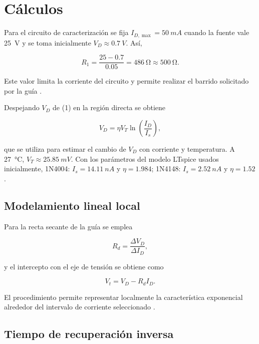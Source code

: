\documentclass[journal,a4paper]{IEEEtran}
\begin{document}
\section{Cálculos}

Para el circuito de caracterización se fija $I_{D,\max}=\SI{50}{mA}$ cuando la fuente vale \SI{25}{V} y se toma inicialmente $V_D\approx\SI{0.7}{V}$. Así,

\begin{equation}
R_1=\frac{25-0.7}{0.05}=\SI{486}{\ohm}\approx\SI{500}{\ohm}.
\label{eq:r1}
\end{equation}

Este valor limita la corriente del circuito y permite realizar el barrido solicitado por la guía \cite{guia}.

Despejando $V_D$ de (1) en la región directa se obtiene

\begin{equation}
V_D=\eta V_T\ln\left(\frac{I_D}{I_s}\right),
\label{eq:vd}
\end{equation}

que se utiliza para estimar el cambio de $V_D$ con corriente y temperatura. A \SI{27}{\celsius}, $V_T\approx\SI{25.85}{mV}$. Con los parámetros del modelo LTspice usados inicialmente, 1N4004: $I_s=\SI{14.11}{nA}$ y $\eta=1.984$; 1N4148: $I_s=\SI{2.52}{nA}$ y $\eta=1.52$.

\subsection{Modelamiento lineal local}

Para la recta secante de la guía se emplea

\begin{equation}
R_d=\frac{\Delta V_D}{\Delta I_D},
\label{eq:rd}
\end{equation}

y el intercepto con el eje de tensión se obtiene como

\begin{equation}
V_t=V_D-R_dI_D.
\label{eq:vt}
\end{equation}

El procedimiento permite representar localmente la característica exponencial alrededor del intervalo de corriente seleccionado \cite{guia,sedra}.

\subsection{Tiempo de recuperación inversa}
\end{document}
